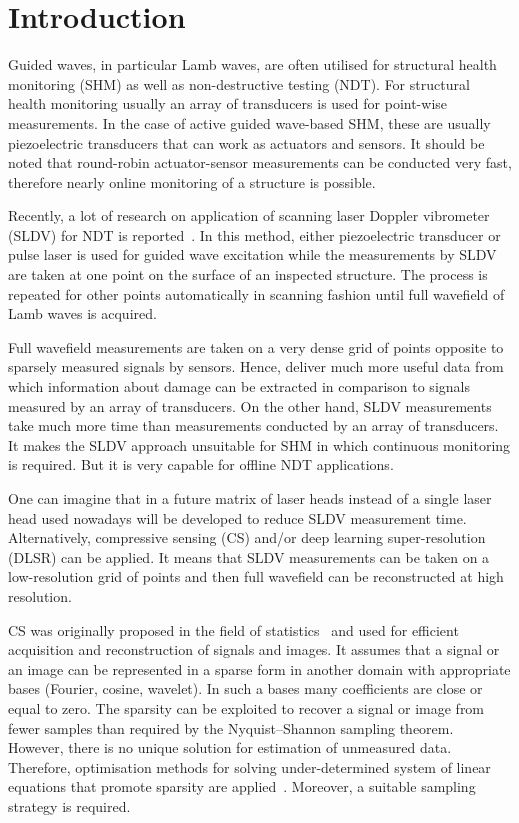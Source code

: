 \section{Introduction}
Guided waves, in particular Lamb waves, are often utilised for structural health monitoring (SHM) as well as non-destructive testing (NDT).
For structural health monitoring usually an array of transducers is used for point-wise measurements.
In the case of active guided wave-based SHM, these are usually piezoelectric transducers that can work as actuators and sensors.
It should be noted that round-robin actuator-sensor measurements can be conducted very fast, therefore nearly online monitoring of a structure is possible.

Recently, a lot of research on application of scanning laser Doppler vibrometer (SLDV) for NDT is reported~\cite{Flynn2013,Kudela2015,Kudela2018d,Segers2021,Segers2022}. 
In this method, either piezoelectric transducer or pulse laser is used for guided wave excitation while the measurements by SLDV are taken at one point on the surface of an inspected structure.
The process is repeated for other points automatically in scanning fashion until full wavefield of Lamb waves is acquired.

Full wavefield measurements are taken on a very dense grid of points opposite to sparsely measured signals by sensors.
Hence, deliver much more useful data from which information about damage can be extracted in comparison to signals measured by an array of transducers.
On the other hand, SLDV measurements take much more time than measurements conducted by an array of transducers.
It makes the SLDV approach unsuitable for SHM in which continuous monitoring is required.
But it is very capable for offline NDT applications.

One can imagine that in a future matrix of laser heads instead of a single laser head used nowadays will be developed to reduce SLDV measurement time.
Alternatively, compressive sensing (CS) and/or deep learning super-resolution (DLSR) can be applied.
It means that SLDV measurements can be taken on a low-resolution grid of points and then full wavefield can be reconstructed at high resolution.

CS was originally proposed in the field of statistics~\cite{Candes2006,Donoho2006} and used for efficient acquisition and reconstruction of signals and images.
It assumes that a signal or an image can be represented in a sparse form in another domain with appropriate bases (Fourier, cosine, wavelet).
In such a bases many coefficients are close or equal to zero.
The sparsity can be exploited to recover a signal or image from fewer samples than required by the Nyquist–Shannon sampling theorem.
However, there is no unique solution for estimation of unmeasured data.
Therefore, optimisation methods for solving under-determined system of linear equations that promote sparsity are applied~\cite{Chen1998,VanEwoutBerg2008,VandenBerg2019}.
Moreover, a suitable sampling strategy is required.

